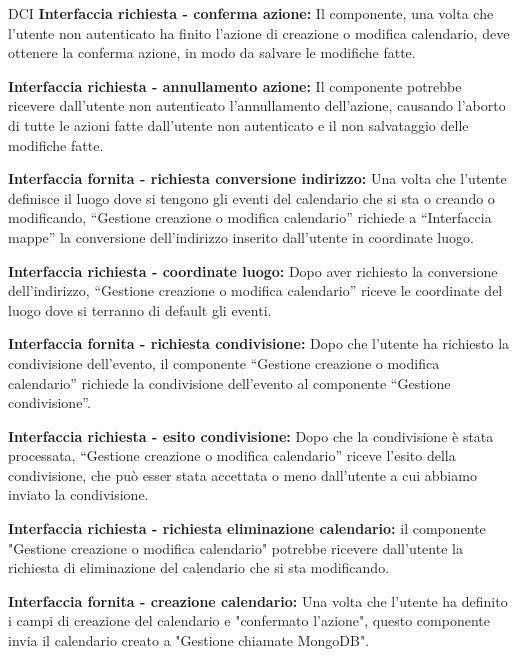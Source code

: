 \begin{listaPersonale}{DCI}
    \textbf{Interfaccia richiesta - conferma azione:} Il componente, una volta che l'utente non autenticato ha finito l'azione di creazione o modifica calendario,  deve ottenere la conferma azione, in modo da salvare le modifiche fatte.

    \textbf{Interfaccia richiesta - annullamento azione:} Il componente potrebbe ricevere dall'utente non autenticato l'annullamento dell'azione, causando l'aborto di tutte le azioni fatte dall'utente non autenticato e il non salvataggio delle modifiche fatte.

    \textbf{Interfaccia fornita - richiesta conversione indirizzo:} Una volta che l'utente definisce il luogo dove si tengono gli eventi del calendario che si sta o creando o modificando, “Gestione creazione o modifica calendario” richiede a “Interfaccia mappe” la conversione dell'indirizzo inserito dall'utente in coordinate luogo.

    \textbf{Interfaccia richiesta - coordinate luogo:} Dopo aver richiesto la conversione dell'indirizzo, “Gestione creazione o modifica calendario” riceve le coordinate del luogo dove si terranno di default gli eventi.

    \textbf{Interfaccia fornita - richiesta condivisione:} Dopo che l'utente ha richiesto la condivisione dell'evento, il componente “Gestione creazione o modifica calendario” richiede la condivisione dell'evento al componente “Gestione condivisione”.

    \textbf{Interfaccia richiesta - esito condivisione:} Dopo che la condivisione è stata processata, “Gestione creazione o modifica calendario” riceve l'esito della condivisione, che può esser stata accettata o meno dall'utente a cui abbiamo inviato la condivisione.

    \textbf{Interfaccia richiesta - richiesta eliminazione calendario:} il componente "Gestione creazione o modifica calendario" potrebbe ricevere dall'utente la richiesta di eliminazione del calendario che si sta modificando.


    \textbf{Interfaccia fornita - creazione calendario: } Una volta che l'utente ha definito i campi di creazione del calendario e "confermato l'azione", questo componente invia il calendario creato a "Gestione chiamate MongoDB".


\end{listaPersonale}
